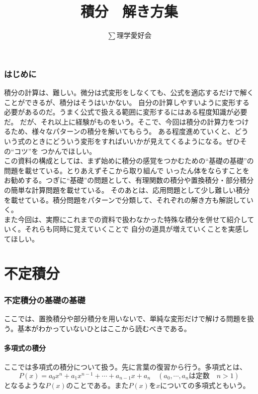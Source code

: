 \documentclass[a4j,dvipdfmx]{jsarticle}
\title{積分　解き方集}
\author{$\sum$理学愛好会}
\date{}
\begin{document}
\maketitle
\section{はじめに}
積分の計算は、難しい。微分は式変形をしなくても、公式を適応するだけで解くことができるが、積分はそうはいかない。
自分の計算しやすいように変形する必要があるのだ。うまく公式で扱える範囲に変形するにはある程度知識が必要だ。
だが、それ以上に経験がものをいう。そこで、今回は積分の計算力をつけるため、様々なパターンの積分を解いてもらう。
ある程度進めていくと、どういう式のときにどういう変形をすればいいかが見えてくるようになる。ぜひその``コツ''を
つかんでほしい。\\

この資料の構成としては、まず始めに積分の感覚をつかむための``基礎の基礎''の問題を載せている。とりあえずそこから取り組んで
いったん体をならすことをお勧めする。つぎに``基礎''の問題として、有理関数の積分や置換積分・部分積分の簡単な計算問題を載せている。
そのあとは、応用問題として少し難しい積分を載せている。積分問題をパターンで分類して、それぞれの解き方も解説していく。\\

また今回は、実際にこれまでの資料で扱わなかった特殊な積分を併せて紹介していく。それらも同時に覚えていくことで
自分の道具が増えていくことを実感してほしい。


\newpage
\tableofcontents
\clearpage

\part{不定積分}
\section{不定積分の基礎の基礎}
ここでは、置換積分や部分積分を用いないで、単純な変形だけで解ける問題を扱う。基本がわかっていないひとはここから読むべきである。
\subsection{多項式の積分}
ここでは多項式の積分について扱う。先に言葉の復習から行う。多項式とは、
\begin{equation*}
    P(x)=a_0 x^n +a_1 x^{n-1} +\cdots+a_{n-1}x+a_n\quad(\text{$a_0,\cdots,a_n$は定数　$n>1$})
\end{equation*}
となるような$P(x)$のことである。また$P(x)$を$x$についての多項式ともいう。
\end{document}
